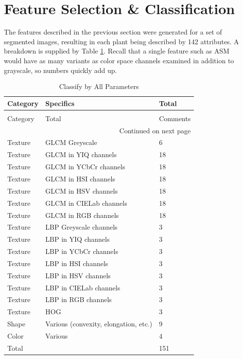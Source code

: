 \documentclass[letterpaper]{report}
\begin{document}
\section{Feature Selection \& Classification}
The features described in the previous section were generated for a set of segmented images, resulting in each plant being described by 142 attributes. A breakdown is supplied by Table \ref{table:parameters}. Recall that a single feature such as ASM would have as many variants as color space channels examined in addition to grayscale, so numbers quickly add up. 
\begin{longtable}{lll}
\caption[Parameters Considered for Classification]{Parameters Considered for Classification}
\label{table:parameters}\\
\toprule
   Category &  Specifics & Total\\
\midrule
\endfirsthead
\caption[]{Classify by All Parameters} \\
\toprule
   Category &  Total & Comments\\
\midrule
\endhead
\midrule
\multicolumn{3}{r}{{Continued on next page}} \\
\midrule
\endfoot

\bottomrule
\endlastfoot
Texture & GLCM Greyscale & 6 \\
Texture & GLCM in YIQ channels & 18 \\
Texture & GLCM in YCbCr channels& 18 \\
Texture & GLCM in HSI channels& 18 \\
Texture & GLCM in HSV channels& 18\\
Texture & GLCM in CIELab channels& 18 \\
Texture & GLCM in RGB channels& 18 \\
Texture & LBP Greyscale channels& 3 \\
Texture & LBP in YIQ channels& 3 \\
Texture & LBP in YCbCr channels& 3 \\
Texture & LBP in HSI channels& 3 \\
Texture & LBP in HSV channels& 3 \\
Texture & LBP in CIELab channels& 3 \\
Texture & LBP in RGB channels& 3 \\
Texture & HOG & 3 \\
Shape & Various (convexity, elongation, etc.) & 9 \\
Color & Various & 4 \\
\midrule
Total& & 151\\
\bottomrule
\end{longtable}
\end{document}

